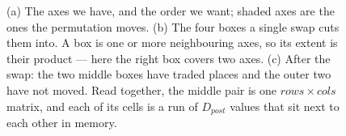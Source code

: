 %
\begin{figure}[!t]
\centering
%
\caption{
(a) The axes we have, and the order we want; shaded axes are the ones the
permutation moves. (b) The four boxes a single swap cuts them into. A box is
one or more neighbouring axes, so its extent is their product --- here the
right box covers two axes. (c) After the swap: the two middle boxes have traded
places and the outer two have not moved. Read together, the middle pair is one
$rows \times cols$ matrix, and each of its cells is a run of $D_{post}$ values
that sit next to each other in memory.}
\label{fig:boxes}
\end{figure}
